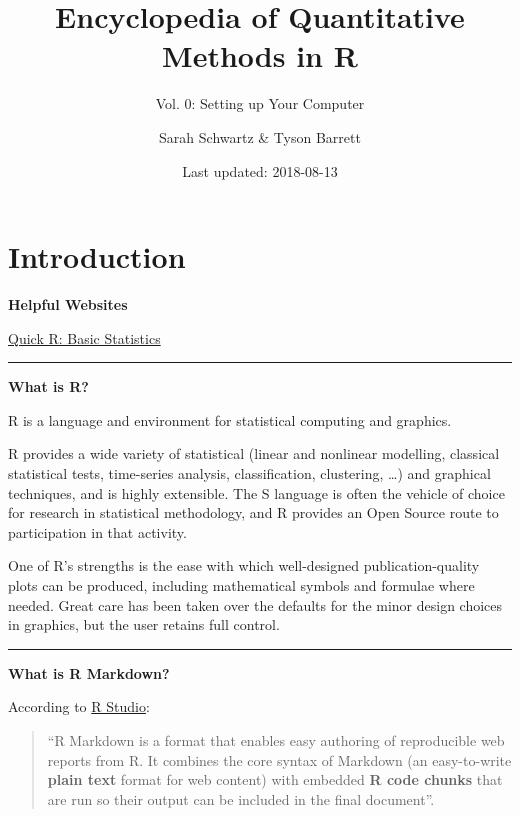 \documentclass[]{book}
\title{Encyclopedia of Quantitative Methods in R}
\subtitle{Vol. 0: Setting up Your Computer}
\author{Sarah Schwartz \& Tyson Barrett}
\date{Last updated: 2018-08-13}
\theoremstyle{definition}
\theoremstyle{definition}
\theoremstyle{definition}
\theoremstyle{remark}
\begin{document}
\maketitle

{
\setcounter{tocdepth}{1}
\tableofcontents
}
\chapter*{Introduction}\label{introduction}

\textbf{Helpful Websites}

\href{https://www.statmethods.net/stats/index.html}{Quick R: Basic
Statistics}

\begin{center}\rule{0.5\linewidth}{\linethickness}\end{center}

\textbf{What is R?}

R is a language and environment for statistical computing and graphics.
\citep{R-base}

R provides a wide variety of statistical (linear and nonlinear
modelling, classical statistical tests, time-series analysis,
classification, clustering, \ldots{}) and graphical techniques, and is
highly extensible. The S language is often the vehicle of choice for
research in statistical methodology, and R provides an Open Source route
to participation in that activity.

One of R's strengths is the ease with which well-designed
publication-quality plots can be produced, including mathematical
symbols and formulae where needed. Great care has been taken over the
defaults for the minor design choices in graphics, but the user retains
full control.

\begin{center}\rule{0.5\linewidth}{\linethickness}\end{center}

\textbf{What is R Markdown?}

According to \href{www.rstudio.com}{R Studio}:

\begin{quote}
``R Markdown is a format that enables easy authoring of reproducible web
reports from R. It combines the core syntax of Markdown (an
easy-to-write \textbf{plain text} format for web content) with embedded
\textbf{R code chunks} that are run so their output can be included in
the final document''.
\end{quote}
\end{document}
